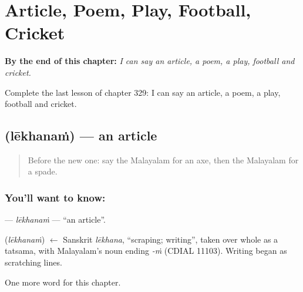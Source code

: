 
\chapter{Article, Poem, Play, Football, Cricket}
\label{ch:ml-article-poem-play-football-cricket}

\begin{chapteropening}
\textbf{By the end of this chapter:} \emph{I can say an article, a poem, a play, football and cricket.}

Complete the last lesson of chapter 329: I can say an article, a poem, a play, football and cricket.
\end{chapteropening}

\section[\texorpdfstring{\ml{ലേഖനം} (lēkhanaṁ)}{ലേഖനം (lēkhanaṁ)}]{ (lēkhanaṁ) — an article}

\label{lesson:ML-C329-lekhanam}



\begin{quote}
Before the new one: say the Malayalam for an axe, then the Malayalam for a spade.
\end{quote}

\subsection*{You'll want to know: }
\textbf{} — \emph{lēkhanaṁ} — \textquotedblleft{}an article\textquotedblright{}.

\begin{cousinweb}
\textbf{} (\emph{lēkhanaṁ}) $\leftarrow$ Sanskrit \emph{lēkhana}, \textquotedblleft{}scraping; writing\textquotedblright{}, taken over whole as a tatsama, with Malayalam's noun ending \emph{-ṁ} (CDIAL 11103). Writing began as scratching lines.
\end{cousinweb}

\begin{grammarlens}[title={What you've built}]
One more word for this chapter.
\end{grammarlens}

